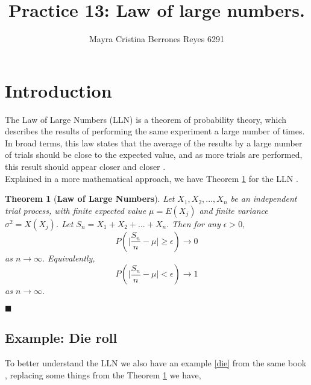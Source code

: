 \documentclass{article}
\newtheorem{theorem}{Theorem}[section]
\begin{document}
\title{%
  Practice 13: Law of large numbers. } %
\author{Mayra Cristina Berrones Reyes 6291}

\maketitle

\section{Introduction}

The Law of Large Numbers (LLN) is a theorem of probability theory, which describes the results of performing the same experiment a large number of times. In broad terms, this law states that the average of the results by a large number of trials should be close to the expected value, and as more trials are performed, this result should appear closer and closer \cite{dekking2005modern}.\\

Explained in a more mathematical approach, we have Theorem \ref{lln} for the LLN \cite{grinstead2012introduction}.\\

\begin{theorem}[\textbf{Law of Large Numbers}]
\label{lln}
Let  $X_1, X_2, ... , X_n $ be an independent trial process, with finite expected value $\mu = E(X_j)$ and finite variance $\sigma^2 = X(X_j)$. Let $S_n = X_1 + X_2 + ... + X_n.$ Then for any $\epsilon > 0,$
\[P \left( \Bigr \lvert \frac{S_n}{n} - \mu \Bigr \rvert \geq \epsilon \right) \rightarrow 0\]
as $n \rightarrow \infty.$ Equivalently,
\[P \left( \Bigr \lvert \frac{S_n}{n} - \mu \Bigr \rvert < \epsilon \right) \rightarrow 1\]
as $n \rightarrow \infty.$
\end{theorem}
\begin{flushright}
$\blacksquare$
\end{flushright}

\subsection{Example: Die roll}

To better understand the LLN we also have an example \ref{die} from the same book \cite{grinstead2012introduction}, replacing some things from the Theorem \ref{lln} we have, 
\end{document}
